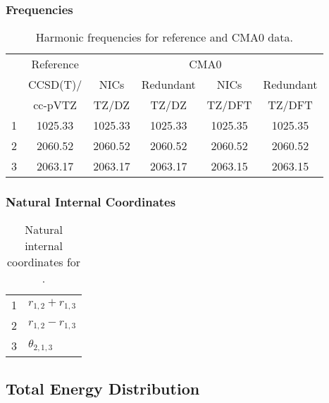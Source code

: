 \documentclass[10pt,oneside]{article}
\begin{document}
\begin{table}[h!]
\subsubsection*{Frequencies}
\centering
\caption{Harmonic frequencies for reference and CMA0 data.}
\begin{tabular}{cccccc}
\toprule
{} & Reference & \multicolumn{4}{c}{CMA0} \\
{} &  CCSD(T)/ &    NICs &  Redundant &    NICs & Redundant \\
{} &   cc-pVTZ &   TZ/DZ &      TZ/DZ &  TZ/DFT &    TZ/DFT \\
\midrule
1 &   1025.33 & 1025.33 &    1025.33 & 1025.35 &   1025.35 \\
2 &   2060.52 & 2060.52 &    2060.52 & 2060.52 &   2060.52 \\
3 &   2063.17 & 2063.17 &    2063.17 & 2063.15 &   2063.15 \\
\bottomrule
\end{tabular}
\end{table}

\begin{table}[h!]
\subsubsection*{Natural Internal Coordinates}
\centering
\caption{Natural internal coordinates for .}
\small
\begin{tabular}{ll}
\toprule
  1   & $r_{1,2} + r_{1,3}$ \\
  2   & $r_{1,2} - r_{1,3}$ \\
  3   & $\theta_{2,1,3}$ \\
\bottomrule
\end{tabular}
\end{table}

\begin{table}
\subsection*{Total Energy Distribution}
\centering\end{table}

\clearpage

\subsection{}
\end{document}
